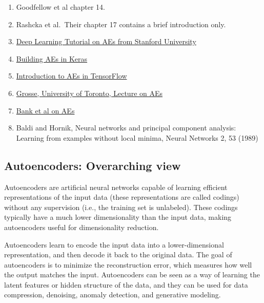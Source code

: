 \documentclass[%
oneside,                 %
final,                   %
10pt]{article}
\begin{document}
\begin{block}{}
\begin{enumerate}
\item Goodfellow et al chapter 14.

\item Rashcka et al.~Their chapter 17 contains a brief introduction only.

\item \href{{http://ufldl.stanford.edu/tutorial/unsupervised/Autoencoders/}}{Deep Learning Tutorial on AEs from Stanford University}

\item \href{{https://blog.keras.io/building-autoencoders-in-keras.html}}{Building AEs in Keras}

\item \href{{https://www.tensorflow.org/tutorials/generative/autoencoder}}{Introduction to AEs in TensorFlow}

\item \href{{http://www.cs.toronto.edu/~rgrosse/courses/csc321_2017/slides/lec20.pdf}}{Grosse, University of Toronto, Lecture on AEs}

\item \href{{https://arxiv.org/abs/2003.05991}}{Bank et al on AEs}  

\item Baldi and Hornik, Neural networks and principal component analysis: Learning from examples without local minima, Neural Networks 2, 53 (1989)
\end{enumerate}

\noindent
\end{block}

\subsection{Autoencoders: Overarching view}

Autoencoders are artificial neural networks capable of learning
efficient representations of the input data (these representations are called codings)  without
any supervision (i.e., the training set is unlabeled). These codings
typically have a much lower dimensionality than the input data, making
autoencoders useful for dimensionality reduction. 

Autoencoders learn to encode the
input data into a lower-dimensional representation, and then decode it
back to the original data. The goal of autoencoders is to minimize the
reconstruction error, which measures how well the output matches the
input. Autoencoders can be seen as a way of learning the latent
features or hidden structure of the data, and they can be used for
data compression, denoising, anomaly detection, and generative
modeling.
\end{document}
